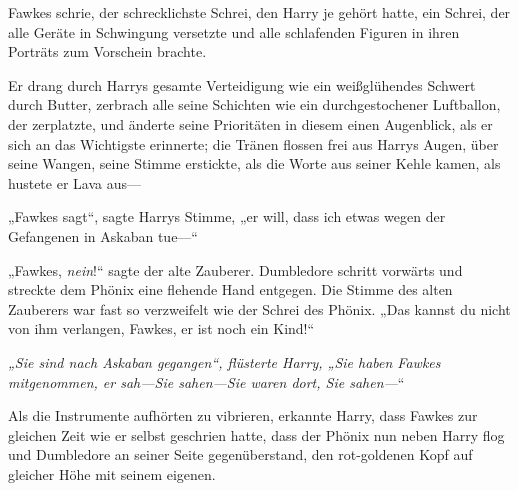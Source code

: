 Fawkes schrie, der schrecklichste Schrei, den Harry je gehört hatte, ein Schrei, der alle Geräte in Schwingung versetzte und alle schlafenden Figuren in ihren Porträts zum Vorschein brachte.

Er drang durch Harrys gesamte Verteidigung wie ein weißglühendes Schwert durch Butter, zerbrach alle seine Schichten wie ein durchgestochener Luftballon, der zerplatzte, und änderte seine Prioritäten in diesem einen Augenblick, als er sich an das Wichtigste erinnerte; die Tränen flossen frei aus Harrys Augen, über seine Wangen, seine Stimme erstickte, als die Worte aus seiner Kehle kamen, als hustete er Lava aus—

„Fawkes sagt“, sagte Harrys Stimme, „er will, dass ich etwas wegen der Gefangenen in Askaban tue—“

„Fawkes, \emph{nein}!“ sagte der alte Zauberer. Dumbledore schritt vorwärts und streckte dem Phönix eine flehende Hand entgegen. Die Stimme des alten Zauberers war fast so verzweifelt wie der Schrei des Phönix.
„Das kannst du nicht von ihm verlangen, Fawkes, er ist noch ein Kind!“

\emph{„Sie sind nach Askaban gegangen“, flüsterte Harry,
„Sie haben Fawkes mitgenommen, er sah—\emph{Sie} sahen—Sie waren \emph{dort}, Sie sahen—}“

Als die Instrumente aufhörten zu vibrieren, erkannte Harry, dass Fawkes zur gleichen Zeit wie er selbst geschrien hatte, dass der Phönix nun neben Harry flog und Dumbledore an seiner Seite gegenüberstand, den rot-goldenen Kopf auf gleicher Höhe mit seinem eigenen.

